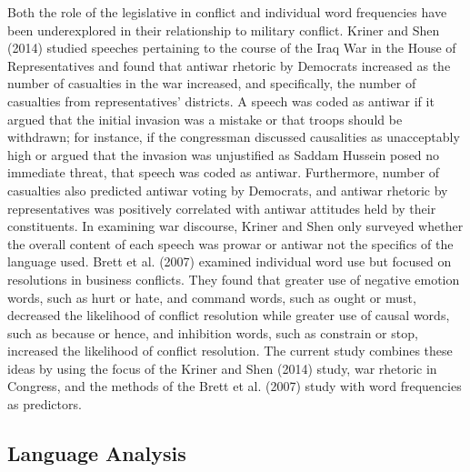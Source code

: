 \documentclass[english,man]{apa6}
\theoremstyle{definition}
\theoremstyle{definition}
\theoremstyle{definition}
\theoremstyle{remark}
\begin{document}
Both the role of the legislative in conflict and individual word
frequencies have been underexplored in their relationship to military
conflict. Kriner and Shen (2014) studied speeches pertaining to the
course of the Iraq War in the House of Representatives and found that
antiwar rhetoric by Democrats increased as the number of casualties in
the war increased, and specifically, the number of casualties from
representatives' districts. A speech was coded as antiwar if it argued
that the initial invasion was a mistake or that troops should be
withdrawn; for instance, if the congressman discussed causalities as
unacceptably high or argued that the invasion was unjustified as Saddam
Hussein posed no immediate threat, that speech was coded as antiwar.
Furthermore, number of casualties also predicted antiwar voting by
Democrats, and antiwar rhetoric by representatives was positively
correlated with antiwar attitudes held by their constituents. In
examining war discourse, Kriner and Shen only surveyed whether the
overall content of each speech was prowar or antiwar not the specifics
of the language used. Brett et al. (2007) examined individual word use
but focused on resolutions in business conflicts. They found that
greater use of negative emotion words, such as hurt or hate, and command
words, such as ought or must, decreased the likelihood of conflict
resolution while greater use of causal words, such as because or hence,
and inhibition words, such as constrain or stop, increased the
likelihood of conflict resolution. The current study combines these
ideas by using the focus of the Kriner and Shen (2014) study, war
rhetoric in Congress, and the methods of the Brett et al. (2007) study
with word frequencies as predictors.

\subsection{Language Analysis}\label{language-analysis}
\end{document}
